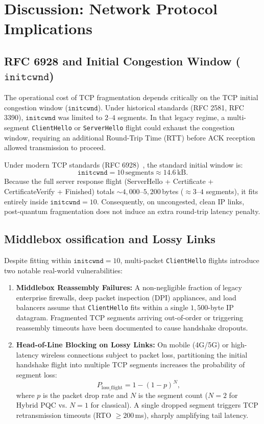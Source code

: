 \documentclass[10pt,twocolumn,a4paper]{article}
\begin{document}
\section{Discussion: Network Protocol Implications}

\subsection{RFC 6928 and Initial Congestion Window (\texorpdfstring{$\texttt{initcwnd}$}{initcwnd})}
The operational cost of TCP fragmentation depends critically on the TCP initial congestion window ($\texttt{initcwnd}$). Under historical standards (RFC 2581, RFC 3390), $\texttt{initcwnd}$ was limited to $2\text{--}4$ segments. In that legacy regime, a multi-segment \texttt{ClientHello} or \texttt{ServerHello} flight could exhaust the congestion window, requiring an additional Round-Trip Time (RTT) before ACK reception allowed transmission to proceed.

Under modern TCP standards (RFC 6928)~\cite{chu2013}, the standard initial window is:
\begin{equation}
\texttt{initcwnd} = 10\,\mathrm{segments} \approx 14.6\,\mathrm{kB}.
\end{equation}
Because the full server response flight (ServerHello + Certificate + CertificateVerify + Finished) totals $\sim 4{,}000\text{--}5{,}200\,$bytes ($\approx 3\text{--}4$ segments), it fits entirely inside $\texttt{initcwnd} = 10$. Consequently, on uncongested, clean IP links, post-quantum fragmentation does not induce an extra round-trip latency penalty.

\subsection{Middlebox ossification and Lossy Links}
Despite fitting within $\texttt{initcwnd} = 10$, multi-packet \texttt{ClientHello} flights introduce two notable real-world vulnerabilities:
\begin{enumerate}
    \item \textbf{Middlebox Reassembly Failures:} A non-negligible fraction of legacy enterprise firewalls, deep packet inspection (DPI) appliances, and load balancers assume that \texttt{ClientHello} fits within a single $1{,}500$-byte IP datagram. Fragmented TCP segments arriving out-of-order or triggering reassembly timeouts have been documented to cause handshake dropouts.
    \item \textbf{Head-of-Line Blocking on Lossy Links:} On mobile (4G/5G) or high-latency wireless connections subject to packet loss, partitioning the initial handshake flight into multiple TCP segments increases the probability of segment loss:
    \begin{equation}
    P_{\mathrm{loss\_flight}} = 1 - (1 - p)^N,
    \end{equation}
    where $p$ is the packet drop rate and $N$ is the segment count ($N=2$ for Hybrid PQC vs. $N=1$ for classical). A single dropped segment triggers TCP retransmission timeouts (RTO $\ge 200\,$ms), sharply amplifying tail latency.
\end{enumerate}
\end{document}
